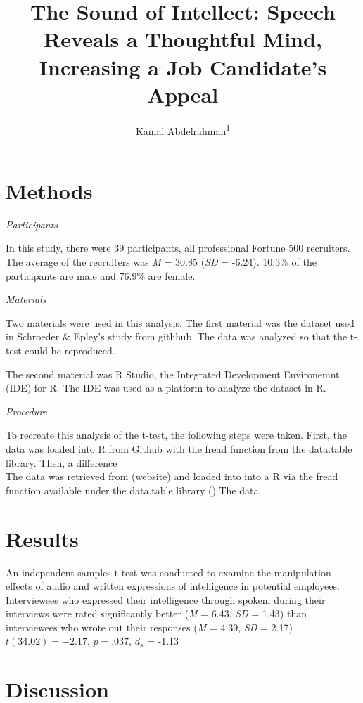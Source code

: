 \documentclass[man]{apa6}
\title{The Sound of Intellect: Speech Reveals a Thoughtful Mind, Increasing a
Job Candidate's Appeal}
\author{Kamal Abdelrahman\textsuperscript{1}}
\date{}
\affiliation{
\vspace{0.5cm}
\textsuperscript{1} City University of New York - Brooklyn College}
\begin{document}
\maketitle

\section{Methods}\label{methods}

\emph{Participants}

In this study, there were 39 participants, all professional Fortune 500
recruiters. The average of the recruiters was \emph{M} = 30.85
(\emph{SD} = -6.24). 10.3\% of the participants are male and 76.9\% are
female.

\emph{Materials}

Two materials were used in this analysis. The first material was the
dataset used in Schroeder \& Epley's study from githhub. The data was
analyzed so that the t-test could be reproduced.

The second material was R Studio, the Integrated Development Environemnt
(IDE) for R. The IDE was used as a platform to analyze the dataset in R.

\emph{Procedure}

To recreate this analysis of the t-test, the following steps were taken.
First, the data was loaded into R from Github with the fread function
from the data.table library. Then, a difference\\
The data was retrieved from (website) and loaded into into a R via the
fread function available under the data.table library () The data

\section{Results}\label{results}

An independent samples t-test was conducted to examine the manipulation
effects of audio and written expressions of intelligence in potential
employees. Interviewees who expressed their intelligence through spokem
during their interviews were rated significantly better (\emph{M} =
6.43, \emph{SD} = 1.43) than interviewees who wrote out their responses
(\emph{M} = 4.39, \emph{SD} = 2.17) \(t(34.02) = -2.17\), \(p = .037\),
\(d_{s}\) = -1.13

\section{Discussion}\label{discussion}
\end{document}
